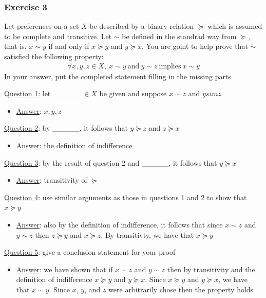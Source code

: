 \documentclass{article}
\begin{document}
\subsubsection{Exercise 3}
Let preferences on a set $X$ be described by a binary relation $\succeq$ which is assumed to be complete and transitive. Let $\sim$ be defined in the standrad way from $\succeq$, that is, $x \sim y$ if and only if $x \succeq y$ and $y \succeq x$. You are goint to help prove that $\sim$ satisfied the following property:
\begin{gather*}
  \forall x,y,z \in X, \ x \sim y \ \text{and} \ y \sim z \ \text{implies} \ x \sim y
\end{gather*}
In your answer, put the completed statement filling in the missing parts
 \par \vspace{0.3em}
  \underline{Question 1}: let \_\_\_\_\_ $\in X$ be given and suppose $x \sim z$ and $y sim z$
  \begin{itemize}
    \item  \underline{Answer}: $x,y,z$
  \end{itemize}
  \par
  \underline{Question 2}: by \_\_\_\_\_, it follows that $y \succeq z$ and $z \succeq x$
  \begin{itemize}
    \item  \underline{Answer}: the definition of indifference
  \end{itemize}
  \par
  \underline{Question 3}: by the result of question 2 and \_\_\_\_\_, it follows that $y \succeq x$
  \begin{itemize}
    \item  \underline{Answer}: transitivity of $\succeq$
  \end{itemize}
  \par
  \underline{Question 4}: use similar arguments as those in questions 1 and 2 to show that $x \succeq y$
  \begin{itemize}
    \item  \underline{Answer}: also by the definition of indifference, it follows that since $x \sim z$ and $y \sim z$ then $z \succeq y$ and $x \succeq z$. By transitivty, we have that $x \succeq y$
  \end{itemize}
  \par
  \underline{Question 5}: give a conclusion statement for your proof
  \begin{itemize}
    \item  \underline{Answer}: we have shown that if $x \sim z$ and $y \sim z$ then by transitivity and the definition of indifference $x \succeq y$ and $y \succeq x$. Since $x \succeq y$ and $y \succeq x$, we have that $x \sim y$. Since $x$, $y$, and $z$ were arbitrarily chose then the property holds
  \end{itemize}
\end{document}
